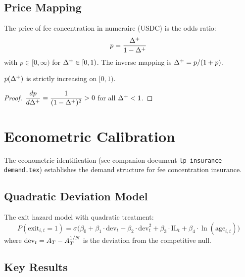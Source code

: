 \subsection{Price Mapping}\label{subsec:price-mapping}

\begin{definition}\label{def:price-mapping}
The price of fee concentration in numeraire (USDC) is the odds ratio:
\begin{equation}\label{eq:price-mapping}
  p = \frac{\Delta^{+}}{1 - \Delta^{+}}
\end{equation}
with $p \in [0, \infty)$ for $\Delta^{+} \in [0, 1)$.
The inverse mapping is $\Delta^{+} = p/(1+p)$.
\end{definition}

\begin{proposition}[Monotonicity]\label{prop:price-monotone}
$p(\Delta^{+})$ is strictly increasing on $[0, 1)$.
\end{proposition}

\begin{proof}
$\dfrac{dp}{d\Delta^{+}} = \dfrac{1}{(1-\Delta^{+})^2} > 0$ for all $\Delta^{+} < 1$. \qedhere
\end{proof}

\section{Econometric Calibration}\label{sec:econometric}

The econometric identification (see companion document \texttt{lp-insurance-demand.tex})
establishes the demand structure for fee concentration insurance.

\subsection{Quadratic Deviation Model}

The exit hazard model with quadratic treatment:
\begin{equation}\label{eq:quadratic-hazard}
  P(\text{exit}_{i,t} = 1) = \sigma\bigl(
    \beta_0 + \beta_1 \cdot \text{dev}_t + \beta_2 \cdot \text{dev}_t^2
    + \beta_3 \cdot \text{IL}_t + \beta_4 \cdot \ln(\text{age}_{i,t})
  \bigr)
\end{equation}
where $\text{dev}_t = A_T - A_T^{1/N}$ is the deviation from the competitive null.

\subsection{Key Results}

